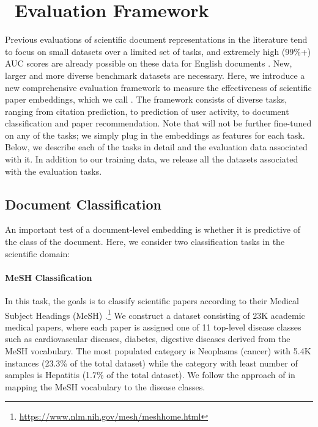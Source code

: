 \section{\dataset\ Evaluation Framework}
\label{sec:eval}


Previous evaluations of scientific document representations in the literature tend to focus on small datasets over a limited set of tasks, and extremely high (99\%+) AUC scores are already possible on these data for English documents \cite{Chen2019ImprovingTN, Wang2019improving}. New, larger and more diverse benchmark datasets are necessary.  Here, we introduce a new comprehensive evaluation framework to measure the effectiveness of scientific paper embeddings, which we call \dataset. The framework consists of diverse tasks, ranging from citation prediction, to prediction of user activity, to document classification and paper recommendation. 
Note that \sys will not be further fine-tuned on any of the tasks; we simply plug in the embeddings as features for each task.
Below, we describe each of the tasks in detail and the evaluation data associated with it. In addition to our training data, we release all the datasets associated with the evaluation tasks. 

\subsection{Document Classification}
An important test of a document-level embedding is whether it is predictive of the class of the document.  Here, we consider two classification tasks in the scientific domain:

\paragraph{MeSH Classification \hspace{1em}}
In this task, the goals is to classify scientific papers according to their Medical Subject Headings (MeSH) \cite{lipscomb2000medical}.\footnote{\url{https://www.nlm.nih.gov/mesh/meshhome.html}} We construct a dataset consisting of 23K academic medical papers, where each paper is assigned one of 11 top-level disease classes such as cardiovascular diseases, diabetes, digestive diseases derived from the MeSH vocabulary.
The most populated category is Neoplasms (cancer) with 5.4K instances (23.3\% of the total dataset) while the category with least number of samples is Hepatitis (1.7\% of the total dataset). We follow the approach of \citet{feldman2019medical} in mapping the MeSH vocabulary to the disease classes. 

